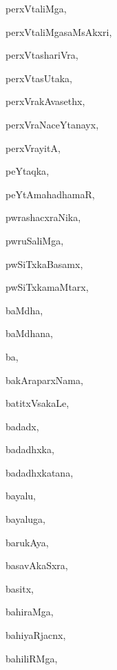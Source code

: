 \begin{multicols}{3}
{\noindent
{perxVtaliMga}, \pageref{perxVtaliMga}

\noindent
{perxVtaliMgasaMsAkxri}, \pageref{perxVtaliMgasaMsAkxri}

\noindent
{perxVtashariVra}, \pageref{perxVtashariVra}

\noindent
{perxVtasUtaka}, \pageref{perxVtasUtaka}

\noindent
{perxVrakAvasethx}, \pageref{perxVrakAvasethx}

\noindent
{perxVraNaceYtanayx}, \pageref{perxVraNaceYtanayx}

\noindent
{perxVrayitA}, \pageref{perxVrayitA}

\noindent
{peYtaqka}, \pageref{peYtaqka}

\noindent
{peYtAmahadhamaR}, \pageref{peYtAmahadhamaR}

\noindent
{pwrashacxraNika}, \pageref{pwrashacxraNika}

\noindent
{pwruSaliMga}, \pageref{pwruSaliMga}

\noindent
{pwSiTxkaBasamx}, \pageref{pwSiTxkaBasamx}

\noindent
{pwSiTxkamaMtarx}, \pageref{pwSiTxkamaMtarx}

\bigskip
\noindent
{}
\smallskip

\noindent
{baMdha}, \pageref{baMdha}

\noindent
{baMdhana}, \pageref{baMdhana}

\noindent
{ba}, \pageref{ba}

\noindent
{bakAraparxNama}, \pageref{bakAraparxNama}

\noindent
{batitxVsakaLe}, \pageref{batitxVsakaLe}

\noindent
{badadx}, \pageref{badadx}

\noindent
{badadhxka}, \pageref{badadhxka}

\noindent
{badadhxkatana}, \pageref{badadhxkatana}

\noindent
{bayalu}, \pageref{bayalu}

\noindent
{bayaluga}, \pageref{bayaluga}

\noindent
{barukAya}, \pageref{barukAya}

\noindent
{basavAkaSxra}, \pageref{basavAkaSxra}

\noindent
{basitx}, \pageref{basitx}

\noindent
{bahiraMga}, \pageref{bahiraMga}

\noindent
{bahiyaRjacnx}, \pageref{bahiyaRjacnx}

\noindent
{bahiliRMga}, \pageref{bahiliRMga}

}
\end{multicols}
